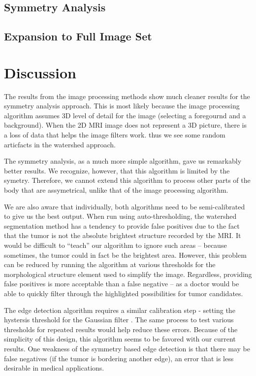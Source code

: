 \documentclass[12pt]{article}
\theoremstyle{plain}%
\theoremstyle{definition}
\theoremstyle{remark}
\begin{document}
\subsection{Symmetry Analysis}

\subsection{Expansion to Full Image Set}

\section{Discussion}

The results from the image processing methods show much cleaner results for the symmetry analysis approach.  This is most likely because the image processing algorithm assumes 3D level of detail for the image (selecting a foregournd and a background).  When the 2D MRI image does not represent a 3D picture, there is a loss of data that helps the image filters work.  thus we see some random articfacts in the watershed approach.

The symmetry analysis, as a much more simple algorithm, gave us remarkably better results.  We recognize, however, that this algorithm is limited by the symetry.  Therefore, we cannot extend this algorithm to process other parts of the body that are assymetrical, unlike that of the image processing algorithm.

We are also aware that individually, both algorithms need to be semi-calibrated to give us the best output.  When run using auto-thresholding, the watershed segmentation method has a tendency to provide false positives due to the fact that the tumor is not the absolute brightest structure recorded by the MRI.  It would be difficult to “teach” our algorithm to ignore such areas – because sometimes, the tumor could in fact be the brightest area.  However, this problem can be reduced by running the algorithm at various thresholds for the morphological structure element used to simplify the image.  Regardless, providing false positives is more acceptable than a false negative – as a doctor would be able to quickly filter through the highlighted possibilities for tumor candidates.

The edge detection algorithm requires a similar calibration step - setting the hystersis threshold for the Gaussian filter .  The same process to test various thresholds for repeated results would help reduce these errors.  Because of the simplicity of this design, this algorithm seems to be favored with our current results.  One weakness of the symmetry based edge detection is that there may be false negatives (if the tumor is bordering another edge), an error that is less desirable in medical applications.
\end{document}
